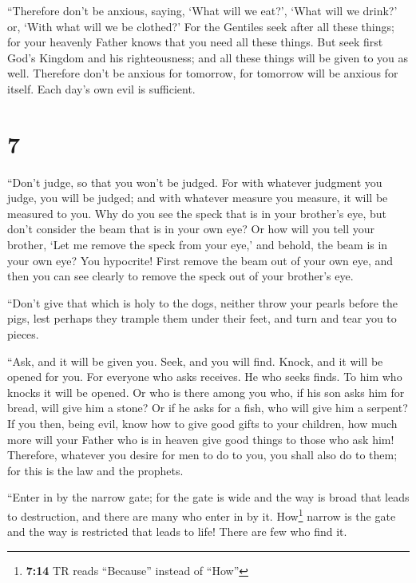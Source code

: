  ``Therefore don't be anxious, saying, `What will we
eat?', `What will we drink?' or, `With what will we be clothed?'
 For the Gentiles seek after all these things; for your
heavenly Father knows that you need all these things. 
But seek first God's Kingdom and his righteousness; and all these things
will be given to you as well.  Therefore don't be anxious
for tomorrow, for tomorrow will be anxious for itself. Each day's own
evil is sufficient.

\hypertarget{section-6}{%
\section{7}\label{section-6}}

 ``Don't judge, so that you won't be judged.
 For with whatever judgment you judge, you will be judged;
and with whatever measure you measure, it will be measured to you.
 Why do you see the speck that is in your brother's eye,
but don't consider the beam that is in your own eye?  Or
how will you tell your brother, `Let me remove the speck from your eye,'
and behold, the beam is in your own eye?  You hypocrite!
First remove the beam out of your own eye, and then you can see clearly
to remove the speck out of your brother's eye.

 ``Don't give that which is holy to the dogs, neither
throw your pearls before the pigs, lest perhaps they trample them under
their feet, and turn and tear you to pieces.

 ``Ask, and it will be given you. Seek, and you will find.
Knock, and it will be opened for you.  For everyone who
asks receives. He who seeks finds. To him who knocks it will be opened.
 Or who is there among you who, if his son asks him for
bread, will give him a stone?  Or if he asks for a fish,
who will give him a serpent?  If you then, being evil,
know how to give good gifts to your children, how much more will your
Father who is in heaven give good things to those who ask him!
 Therefore, whatever you desire for men to do to you, you
shall also do to them; for this is the law and the prophets.

 ``Enter in by the narrow gate; for the gate is wide and
the way is broad that leads to destruction, and there are many who enter
in by it.  How\footnote{\textbf{7:14} TR reads
  ``Because'' instead of ``How''} narrow is the gate and the way is
restricted that leads to life! There are few who find it.

